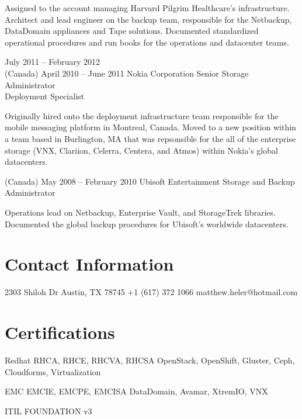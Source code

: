 \documentclass{tccv}
\begin{document}
\begin{eventlist}
Assigned to the account managing Harvard Pilgrim Healthcare's infrastructure. Architect and lead engineer on the backup team, responsible for the Netbackup, DataDomain appliances and Tape solutions. Documented standardized operational procedures and run books for the operations and datacenter teams.

\item{July 2011 -- February 2012 \\ (Canada) April 2010 -- June 2011}
     {Nokia Corporation}
     {Senior Storage Administrator \\ Deployment Specialist}

Originally hired onto the deployment infrastructure team responsible for the mobile messaging platform in Montreal, Canada. Moved to a new position within a team based in Burlington, MA that was repsonsible for the all of the enterprise storage (VNX, Clariion, Celerra, Centera, and Atmos) within Nokia's global datacenters.

\item{(Canada) May 2008 -- February 2010}
    {Ubisoft Entertainment}
    {Storage and Backup Administrator}

Operations lead on Netbackup, Enterprise Vault, and StorageTrek libraries. Documented the global backup procedures for Ubisoft's worldwide datacenters.
\end{eventlist}

\section{Contact Information}

\personal
    {2303 Shiloh Dr \newline Austin, TX 78745}
    {+1 (617) 372 1066}
    {matthew.heler@hotmail.com}

\section{Certifications}

\begin{yearlist}

\item{Redhat}
	{RHCA, RHCE, RHCVA, RHCSA}
	{OpenStack, OpenShift, Gluster, Ceph, Cloudforms, Virtualization}

\item{EMC}
	{EMCIE, EMCPE, EMCISA}
	{DataDomain, Avamar, XtremIO, VNX}
	
\item{ITIL}
	{FOUNDATION v3}

\end{yearlist}
\end{document}
